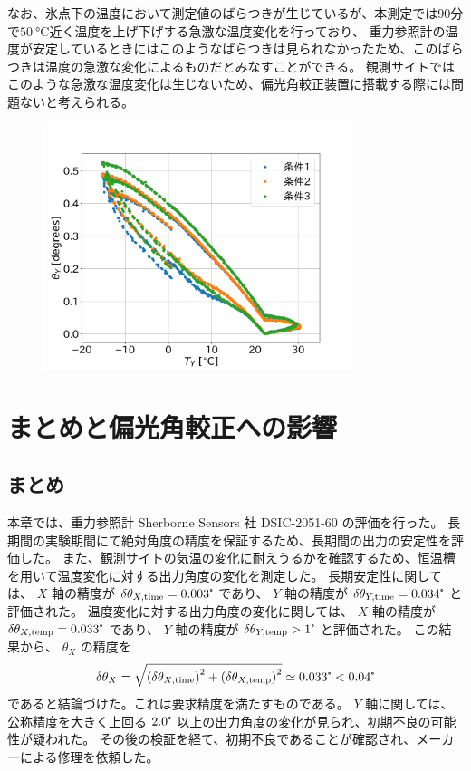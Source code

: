 \documentclass[../../main.tex]{subfiles}
\begin{document}
なお、氷点下の温度において測定値のばらつきが生じているが、本測定では90分で$\SI{50}{\degreeCelsius}$近く温度を上げ下げする急激な温度変化を行っており、
重力参照計の温度が安定しているときにはこのようなばらつきは見られなかったため、このばらつきは温度の急激な変化によるものだとみなすことができる。
観測サイトではこのような急激な温度変化は生じないため、偏光角較正装置に搭載する際には問題ないと考えられる。
\begin{figure}[H]
    \centering
    \includegraphics[width=0.8\textwidth]{tiltsensor/angleY_huryou_test.png}
    \label{fig:angleY_huryou_test}
\end{figure}

\section{まとめと偏光角較正への影響}
\subsection{まとめ}
本章では、重力参照計 Sherborne Sensors 社 DSIC-2051-60 の評価を行った。
長期間の実験期間にて絶対角度の精度を保証するため、長期間の出力の安定性を評価した。
また、観測サイトの気温の変化に耐えうるかを確認するため、恒温槽を用いて温度変化に対する出力角度の変化を測定した。
長期安定性に関しては、 $X$ 軸の精度が $\delta\theta_{X,\mathrm{time}} = 0.003\tcdegree$ であり、
$Y$ 軸の精度が $\delta\theta_{Y,\mathrm{time}} = 0.034\tcdegree$ と評価された。
温度変化に対する出力角度の変化に関しては、 $X$ 軸の精度が $\delta\theta_{X,\mathrm{temp}} = 0.033\tcdegree$ であり、
$Y$ 軸の精度が $\delta\theta_{Y,\mathrm{temp}} > 1\tcdegree$ と評価された。
この結果から、 $\theta_{X}$ の精度を 
\begin{equation}
    \delta\theta_X = \sqrt{\qty(\delta\theta_{X,\mathrm{time}})^2 + \qty(\delta\theta_{X,\mathrm{temp}})^2}\simeq 0.033\tcdegree < 0.04\tcdegree
\end{equation}
であると結論づけた。これは要求精度を満たすものである。
$Y$ 軸に関しては、公称精度を大きく上回る $2.0\tcdegree$ 以上の出力角度の変化が見られ、初期不良の可能性が疑われた。
その後の検証を経て、初期不良であることが確認され、メーカーによる修理を依頼した。
\end{document}

